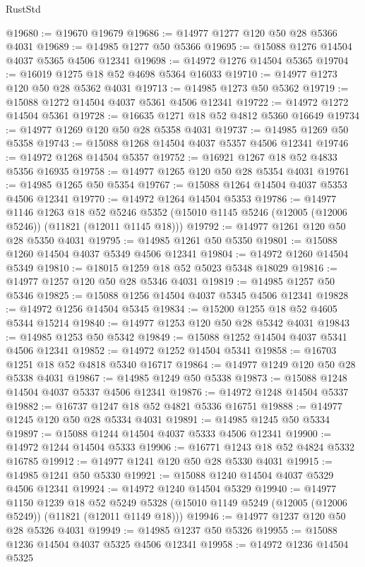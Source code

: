 \begin{lexlean}{RustStd}
\begin{coremodule}
@19680 := @19670 @19679
@19686 := @14977 @1277 @120 @50 @28 @5366 @4031
@19689 := @14985 @1277 @50 @5366
@19695 := @15088 @1276 @14504 @4037 @5365 @4506 @12341
@19698 := @14972 @1276 @14504 @5365
@19704 := @16019 @1275 @18 @52 @4698 @5364 @16033
@19710 := @14977 @1273 @120 @50 @28 @5362 @4031
@19713 := @14985 @1273 @50 @5362
@19719 := @15088 @1272 @14504 @4037 @5361 @4506 @12341
@19722 := @14972 @1272 @14504 @5361
@19728 := @16635 @1271 @18 @52 @4812 @5360 @16649
@19734 := @14977 @1269 @120 @50 @28 @5358 @4031
@19737 := @14985 @1269 @50 @5358
@19743 := @15088 @1268 @14504 @4037 @5357 @4506 @12341
@19746 := @14972 @1268 @14504 @5357
@19752 := @16921 @1267 @18 @52 @4833 @5356 @16935
@19758 := @14977 @1265 @120 @50 @28 @5354 @4031
@19761 := @14985 @1265 @50 @5354
@19767 := @15088 @1264 @14504 @4037 @5353 @4506 @12341
@19770 := @14972 @1264 @14504 @5353
@19786 := @14977
    @1146
    @1263
    @18
    @52
    @5246
    @5352
    (@15010 @1145 @5246 (@12005 (@12006 @5246)) (@11821 (@12011 @1145 @18)))
@19792 := @14977 @1261 @120 @50 @28 @5350 @4031
@19795 := @14985 @1261 @50 @5350
@19801 := @15088 @1260 @14504 @4037 @5349 @4506 @12341
@19804 := @14972 @1260 @14504 @5349
@19810 := @18015 @1259 @18 @52 @5023 @5348 @18029
@19816 := @14977 @1257 @120 @50 @28 @5346 @4031
@19819 := @14985 @1257 @50 @5346
@19825 := @15088 @1256 @14504 @4037 @5345 @4506 @12341
@19828 := @14972 @1256 @14504 @5345
@19834 := @15200 @1255 @18 @52 @4605 @5344 @15214
@19840 := @14977 @1253 @120 @50 @28 @5342 @4031
@19843 := @14985 @1253 @50 @5342
@19849 := @15088 @1252 @14504 @4037 @5341 @4506 @12341
@19852 := @14972 @1252 @14504 @5341
@19858 := @16703 @1251 @18 @52 @4818 @5340 @16717
@19864 := @14977 @1249 @120 @50 @28 @5338 @4031
@19867 := @14985 @1249 @50 @5338
@19873 := @15088 @1248 @14504 @4037 @5337 @4506 @12341
@19876 := @14972 @1248 @14504 @5337
@19882 := @16737 @1247 @18 @52 @4821 @5336 @16751
@19888 := @14977 @1245 @120 @50 @28 @5334 @4031
@19891 := @14985 @1245 @50 @5334
@19897 := @15088 @1244 @14504 @4037 @5333 @4506 @12341
@19900 := @14972 @1244 @14504 @5333
@19906 := @16771 @1243 @18 @52 @4824 @5332 @16785
@19912 := @14977 @1241 @120 @50 @28 @5330 @4031
@19915 := @14985 @1241 @50 @5330
@19921 := @15088 @1240 @14504 @4037 @5329 @4506 @12341
@19924 := @14972 @1240 @14504 @5329
@19940 := @14977
    @1150
    @1239
    @18
    @52
    @5249
    @5328
    (@15010 @1149 @5249 (@12005 (@12006 @5249)) (@11821 (@12011 @1149 @18)))
@19946 := @14977 @1237 @120 @50 @28 @5326 @4031
@19949 := @14985 @1237 @50 @5326
@19955 := @15088 @1236 @14504 @4037 @5325 @4506 @12341
@19958 := @14972 @1236 @14504 @5325

\end{coremodule}
\end{lexlean}
